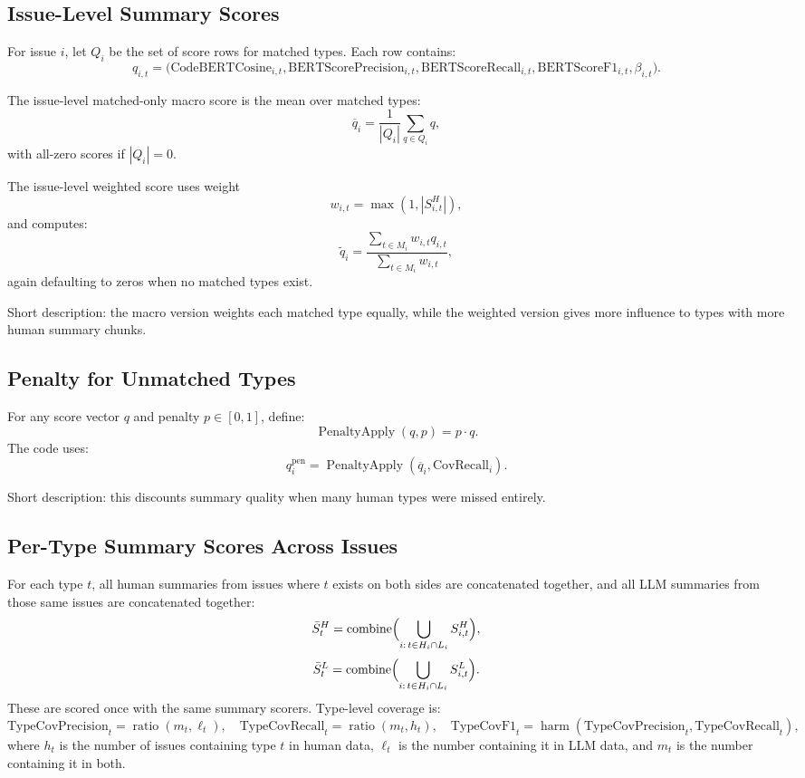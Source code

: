 \documentclass[11pt]{article}
\begin{document}
\subsection{Issue-Level Summary Scores}
For issue $i$, let $Q_i$ be the set of score rows for matched types. Each row contains:
\[
q_{i,t} =
\bigl(
\mathrm{CodeBERTCosine}_{i,t},
\mathrm{BERTScorePrecision}_{i,t},
\mathrm{BERTScoreRecall}_{i,t},
\mathrm{BERTScoreF1}_{i,t},
\beta_{i,t}
\bigr).
\]

The issue-level matched-only macro score is the mean over matched types:
\[
\overline{q}_i = \frac{1}{|Q_i|}\sum_{q \in Q_i} q,
\]
with all-zero scores if $|Q_i|=0$.

The issue-level weighted score uses weight
\[
w_{i,t}=\max(1,|S_{i,t}^{H}|),
\]
and computes:
\[
\widetilde{q}_i=\frac{\sum_{t \in M_i} w_{i,t} q_{i,t}}{\sum_{t \in M_i} w_{i,t}},
\]
again defaulting to zeros when no matched types exist.

Short description: the macro version weights each matched type equally, while the weighted version gives more influence to types with more human summary chunks.

\subsection{Penalty for Unmatched Types}
For any score vector $q$ and penalty $p \in [0,1]$, define:
\[
\operatorname{PenaltyApply}(q,p)=p \cdot q.
\]
The code uses:
\[
q^{\mathrm{pen}}_i = \operatorname{PenaltyApply}(\overline{q}_i,\mathrm{CovRecall}_i).
\]

Short description: this discounts summary quality when many human types were missed entirely.

\subsection{Per-Type Summary Scores Across Issues}
For each type $t$, all human summaries from issues where $t$ exists on both sides are concatenated together, and all LLM summaries from those same issues are concatenated together:
\[
\bar{S}_{t}^{H}=\operatorname{combine}\Bigl(\bigcup_{i:\, t \in H_i \cap L_i} S_{i,t}^{H}\Bigr),
\]
\[
\bar{S}_{t}^{L}=\operatorname{combine}\Bigl(\bigcup_{i:\, t \in H_i \cap L_i} S_{i,t}^{L}\Bigr).
\]
These are scored once with the same summary scorers. Type-level coverage is:
\[
\mathrm{TypeCovPrecision}_t=\operatorname{ratio}(m_t,\ell_t),\quad
\mathrm{TypeCovRecall}_t=\operatorname{ratio}(m_t,h_t),\quad
\mathrm{TypeCovF1}_t=\operatorname{harm}(\mathrm{TypeCovPrecision}_t,\mathrm{TypeCovRecall}_t),
\]
where $h_t$ is the number of issues containing type $t$ in human data, $\ell_t$ is the number containing it in LLM data, and $m_t$ is the number containing it in both.
\end{document}
